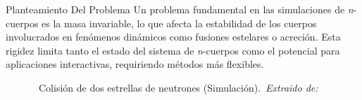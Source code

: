 \begin{frame}{Planteamiento Del Problema}%
    \vspace{-0.15cm}
    {\fontsize{8pt}{10pt}\selectfont
    Un problema fundamental en las simulaciones de \textit{n}-cuerpos es la masa invariable, lo que afecta la estabilidad de los cuerpos involucrados en fenómenos dinámicos como fusiones estelares o acreción. Esta rigidez limita tanto el estado del sistema de \textit{n}-cuerpos como el potencial para aplicaciones interactivas, requiriendo métodos más flexibles.}
    \vspace{0cm}
    \begin{figure}[H]
        \centering
        \href{run:C:/Users/emicr/Documents/ESCOLARES/ESCOM/TRABAJO TERMINAL/Presentacion/img/introduccion/Neutron_Star_Merger_high.mp4}{%
        }
        \vspace{-0.25cm}
        \caption{\tiny~Colisión de dos estrellas de neutrones (Simulación).~\textit{Extraido de:}~\cite{nasa_star_collision_2018}}%
        \label{fig:neutron_star_merger}
    \end{figure}
\end{frame}

